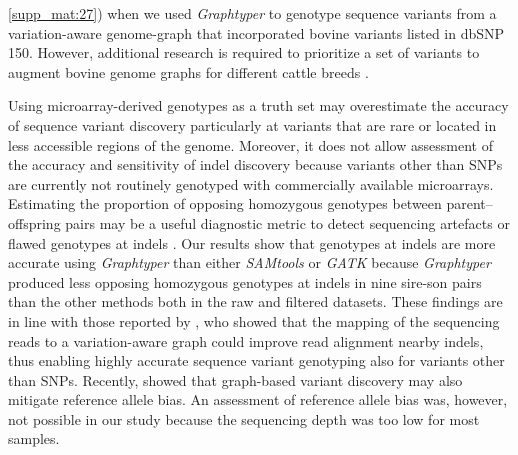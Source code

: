 \documentclass[../main.tex]{subfiles}
\begin{document}
\ref{supp_mat:27}) when we used \emph{Graphtyper} to genotype sequence variants from a variation-aware genome-graph that incorporated bovine variants listed in dbSNP 150. However, additional research is required to prioritize a set of variants to augment bovine genome graphs for different cattle breeds \citep{pritt2018forge}.

Using microarray-derived genotypes as a truth set may overestimate the accuracy of sequence variant discovery particularly at variants that are rare or located in less accessible regions of the genome. Moreover, it does not allow assessment of the accuracy and sensitivity of indel discovery because variants other than SNPs are currently not routinely genotyped with commercially available microarrays. Estimating the proportion of opposing homozygous genotypes between parent–offspring pairs may be a useful diagnostic metric to detect sequencing artefacts or flawed genotypes at indels \citep{patel2014struggle}. Our results show that genotypes at indels are more accurate using \emph{Graphtyper} than either \emph{SAMtools} or \emph{GATK} because \emph{Graphtyper} produced less opposing homozygous genotypes at indels in nine sire-son pairs than the other methods both in the raw and filtered datasets. These findings are in line with those reported by \citep{eggertsson2017graphtyper}, who showed that the mapping of the sequencing reads to a variation-aware graph could improve read alignment nearby indels, thus enabling highly accurate sequence variant genotyping also for variants other than SNPs. Recently, \citep{garrison2018variation} showed that graph-based variant discovery may also mitigate reference allele bias. An assessment of reference allele bias was, however, not possible in our study because the sequencing depth was too low for most samples.
\end{document}
